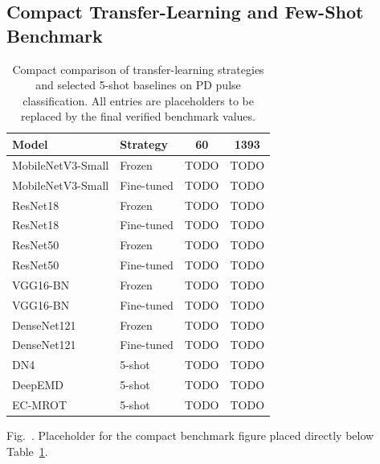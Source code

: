 \documentclass[journal]{IEEEtran}
\newcommand{\method}{EC-MROT}
\newcommand{\1}{\mathbf{1}}
\begin{document}
\subsection{Compact Transfer-Learning and Few-Shot Benchmark}

\begin{table}[!t]
\centering
\caption{Compact comparison of transfer-learning strategies and selected 5-shot baselines on PD pulse classification. All entries are placeholders to be replaced by the final verified benchmark values.}
\label{tab:tl_fsl_comparison}
\scriptsize
\renewcommand{\arraystretch}{1.08}
\setlength{\tabcolsep}{2.5pt}
\begin{tabular*}{\columnwidth}{@{\extracolsep{\fill}}llcc@{}}
\toprule
\textbf{Model} & \textbf{Strategy} & \textbf{60} & \textbf{1393} \\
\midrule
MobileNetV3-Small & Frozen & TODO & TODO \\
MobileNetV3-Small & Fine-tuned & TODO & TODO \\
ResNet18 & Frozen & TODO & TODO \\
ResNet18 & Fine-tuned & TODO & TODO \\
ResNet50 & Frozen & TODO & TODO \\
ResNet50 & Fine-tuned & TODO & TODO \\
VGG16-BN & Frozen & TODO & TODO \\
VGG16-BN & Fine-tuned & TODO & TODO \\
DenseNet121 & Frozen & TODO & TODO \\
DenseNet121 & Fine-tuned & TODO & TODO \\
\midrule
DN4~\cite{li2019dn4} & 5-shot & TODO & TODO \\
DeepEMD~\cite{zhang2020deepemd} & 5-shot & TODO & TODO \\
\method{} & 5-shot & TODO & TODO \\
\bottomrule
\end{tabular*}
\end{table}

\begin{center}
\end{center}
{\footnotesize Fig.~\thefigure. Placeholder for the compact benchmark figure placed directly below Table~\ref{tab:tl_fsl_comparison}.\label{fig:compact_benchmark_placeholder}\par}
\end{document}
